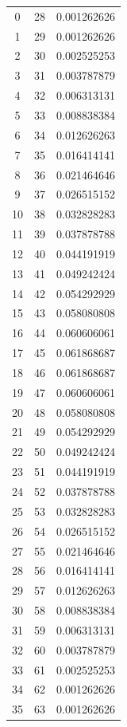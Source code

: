 \documentclass[10pt]{article}
\begin{document}
\begin{center}
\begin{longtable}{ccc}
0  & 28 & 0.001262626 \\
1  & 29 & 0.001262626 \\
2  & 30 & 0.002525253 \\
3  & 31 & 0.003787879 \\
4  & 32 & 0.006313131 \\
5  & 33 & 0.008838384 \\
6  & 34 & 0.012626263 \\
7  & 35 & 0.016414141 \\
8  & 36 & 0.021464646 \\
9  & 37 & 0.026515152 \\
10 & 38 & 0.032828283 \\
11 & 39 & 0.037878788 \\
12 & 40 & 0.044191919 \\
13 & 41 & 0.049242424 \\
14 & 42 & 0.054292929 \\
15 & 43 & 0.058080808 \\
16 & 44 & 0.060606061 \\
17 & 45 & 0.061868687 \\
18 & 46 & 0.061868687 \\
19 & 47 & 0.060606061 \\
20 & 48 & 0.058080808 \\
21 & 49 & 0.054292929 \\
22 & 50 & 0.049242424 \\
23 & 51 & 0.044191919 \\
24 & 52 & 0.037878788 \\
25 & 53 & 0.032828283 \\
26 & 54 & 0.026515152 \\
27 & 55 & 0.021464646 \\
28 & 56 & 0.016414141 \\
29 & 57 & 0.012626263 \\
30 & 58 & 0.008838384 \\
31 & 59 & 0.006313131 \\
32 & 60 & 0.003787879 \\
33 & 61 & 0.002525253 \\
34 & 62 & 0.001262626 \\
35 & 63 & 0.001262626 \\
\end{longtable}
\end{center}
\end{document}
